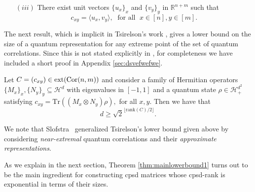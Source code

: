 \documentclass{siamart}
\begin{document}
{\begin{theorem}[\cite{TS87}]
\begin{itemize}
\begin{itemize} \item[$(a)$] $c_{xy}=\Psi_d^*(\gamma(u_x)\otimes
\gamma(v_y)^\top)\Psi_d,\ $ for all  $x\in [n],y\in [m]$;
\vspace{0.1cm}
\item[$(b)$]  $\Psi_d^*( \gamma(u_x)\otimes I)\Psi_d = 0,\ $ for all  $x\in [n]$;
\vspace{0.1cm}
\item[$(c)$] $\Psi_d^*(I \otimes \gamma(v_y)^\top)\Psi_d = 0,\ $ for all  $y\in
[m]$, \end{itemize} where $d:=2^{\left\lfloor \frac{n+m}{2}\right\rfloor}$, $\Psi_d$ is the $d$-dimensional maximally
entangled state defined in \eqref{eq:maxentangled}  and 
the map $\gamma$ is defined in Theorem \ref{thm:cliffordalgebramain}.
 \vspace{0.1cm}
\item[$(iii)$] There exist unit vectors $\{u_x\}_x$ and $\{v_y\}_{y}$ in ${\mathbb{R}}^{n+m}$ such that
$$c_{xy}={\langle} u_x,v_y{\rangle}, \; \text{ for all } \; x\in [n], y\in [m].$$
\end{itemize}
\end{theorem}

The next result, which  is implicit  in  Tsirelson's work
\cite{TS87}, gives a lower bound on the size of a quantum
representation for any extreme point of the set of quantum
correlations. Since this is not stated explicitly in  \cite{TS87},
for completeness  we have included a short  proof in 
{Appendix} \ref{sec:dsvefwefwe}.

\medskip 
\begin{theorem}[\cite{TS87}]\label{thm:mainlowerbound1}
 Let   $C=(c_{xy}) \in {{\rm ext}({\mathrm{Cor}(n,m)})}$  and consider a  family of   Hermitian operators
 $\{M_x\}_{x}, \{N_y\}_{y}\subseteq {\mathcal{H}}^d$ with eigenvalues  in $[-1,1]$ and a quantum state $\rho\in{\mathcal{H}}^{d^2}_+$ satisfying
$c_{xy}={\mathrm{Tr}}((M_x\otimes N_y)\rho),$ for all $x,y$. Then we have that
$$d\ge {\sqrt{2}^{\lfloor{\mathrm{rank}}(C)/ 2\rfloor}}.$$
\end{theorem}
\medskip

{We note that Slofstra~\cite{S11} generalized Tsirelson's lower bound given above  by considering {\emph{near-extremal}} quantum correlations and their {\emph{approximate representations}}.}

As we explain in the next section, Theorem
\ref{thm:mainlowerbound1} turns out to be the  main ingredient for
constructing  cpsd matrices whose cpsd-rank is exponential in terms
of their {sizes}.

}
\end{document}
